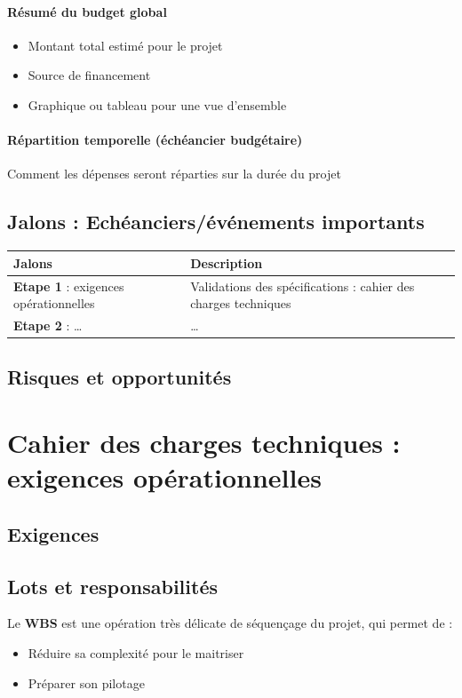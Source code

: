 \paragraph{Résumé du budget global}
\begin{itemize}
    \item Montant total estimé pour le projet
    \item Source de financement 
    \item Graphique ou tableau pour une vue d'ensemble
\end{itemize}
\paragraph{Répartition temporelle (échéancier budgétaire)}
Comment les dépenses seront réparties sur la durée du projet

\subsection{Jalons : Echéanciers/événements importants}
\begin{table}[!h]
    \centering  
    \begin{tabular}{|p{7cm}|p{7cm}|}  
    \hline  
    \textbf{Jalons} & \textbf{Description}\\
    \hline
    \textbf{Etape 1 }: exigences opérationnelles & Validations des spécifications : cahier des charges techniques\\
    \hline
    \textbf{Etape 2} : \dots & \dots\\
    \hline
    \end{tabular}
\end{table}
\subsection{Risques et opportunités}

\section{Cahier des charges techniques : exigences opérationnelles}
\subsection{Exigences}

\subsection{Lots et responsabilités}
Le \textbf{WBS} est une opération très délicate de séquençage du projet, qui permet de :
\begin{itemize}
	\item Réduire sa complexité pour le maitriser
	\item Préparer son pilotage
\end{itemize}
